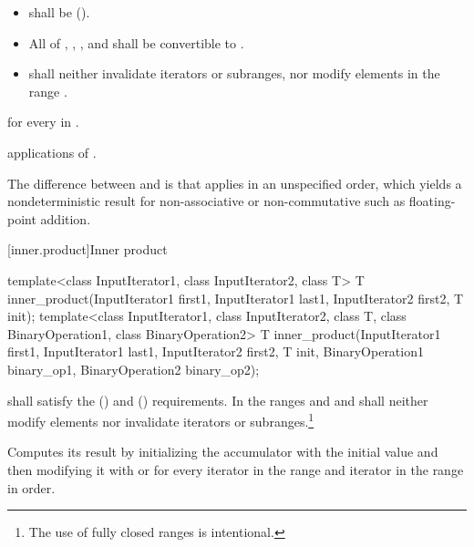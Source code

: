 \begin{itemdescr}
\pnum
\requires
\begin{itemize}
\item {} shall be  ().
\item All of , ,
, and  shall be
convertible to .
\item {} shall neither invalidate iterators or subranges, nor modify
elements in the range .
\end{itemize}

\pnum
\returns
{} for every  in .

\pnum
\complexity
{} applications of .

\pnum
\begin{note}
The difference between  and  is that
 applies  in an unspecified order, which yields
a nondeterministic result for non-associative or non-commutative
 such as floating-point addition.
\end{note}
\end{itemdescr}

[inner.product]{Inner product}

%
\begin{itemdecl}
template<class InputIterator1, class InputIterator2, class T>
  T inner_product(InputIterator1 first1, InputIterator1 last1,
                  InputIterator2 first2, T init);
template<class InputIterator1, class InputIterator2, class T,
         class BinaryOperation1, class BinaryOperation2>
  T inner_product(InputIterator1 first1, InputIterator1 last1,
                  InputIterator2 first2, T init,
                  BinaryOperation1 binary_op1,
                  BinaryOperation2 binary_op2);
\end{itemdecl}

\begin{itemdescr}
\pnum
\requires
{} shall satisfy the  ()
and  () requirements.
In the ranges
and
and
shall neither modify elements nor invalidate iterators or subranges.\footnote{The use of fully closed ranges is intentional.}

\pnum
\effects
Computes its result by initializing the accumulator
with the initial value
and then modifying it with
or
for every iterator
in the range 
and iterator
in the range
in order.
\end{itemdescr}

